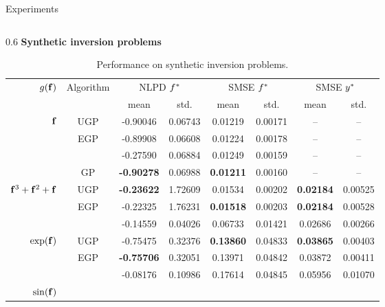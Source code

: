 \documentclass[final]{beamer}
\newlength{\twocolwid}
\begin{document}
\begin{frame}[t]
\begin{columns}[t]
\begin{column}{\twocolwid}
\begin{columns}[t,totalwidth=\twocolwid]
\begin{column}{\twocolwid}
\begin{block}{Experiments}
\begin{columns}
\begin{column}{0.6\twocolwid}
\textbf{Synthetic inversion problems}


\begin{table}[tb]
    \centering

    \caption[]{
        Performance on synthetic inversion problems.
        }
    \vspace{5mm}
    \small
    \begin{tabular}{r|c| c c c c c c}
        \multirow{2}{*}{$g\!\left({{\mathbf{f}}}\right)$} & \multirow{2}{*}{Algorithm} & 
            \multicolumn{2}{c}{NLPD $f^{*}$} &
            \multicolumn{2}{c}{SMSE $f^{*}$} &
            \multicolumn{2}{c}{SMSE $y^{*}$} \\
        & & mean & std. & mean & std. & mean & std.\\
        \toprule
        $\mathbf{f}$ 
& UGP & -0.90046 & 0.06743 & 0.01219 & 0.00171 & -- & -- \\
& EGP & -0.89908 & 0.06608 & 0.01224 & 0.00178 & -- & -- \\
& \cite{Opper2009} & -0.27590 & 0.06884 & 0.01249 & 0.00159 & -- & -- \\
& GP & \textbf{-0.90278} & 0.06988 & \textbf{0.01211} & 0.00160 & -- & -- \\
        \midrule
        $\mathbf{f}^3 + \mathbf{f}^2 + \mathbf{f}$ 
& UGP & \textbf{-0.23622} & 1.72609 & 0.01534 & 0.00202 & \textbf{0.02184} & 0.00525 \\
& EGP & -0.22325 & 1.76231 & \textbf{0.01518} & 0.00203 & \textbf{0.02184} & 0.00528 \\
& \cite{Opper2009} & -0.14559 & 0.04026 & 0.06733 & 0.01421 & 0.02686 & 0.00266 \\
        \midrule
        $\exp\!\left({\mathbf{f}}\right)$ 
& UGP & -0.75475 & 0.32376 & \textbf{0.13860} & 0.04833 & \textbf{0.03865} & 0.00403 \\
& EGP & \textbf{-0.75706} & 0.32051 & 0.13971 & 0.04842 & 0.03872 & 0.00411 \\
& \cite{Opper2009} & -0.08176 & 0.10986 & 0.17614 & 0.04845 & 0.05956 & 0.01070 \\
        \midrule
        $\sin\!\left({\mathbf{f}}\right)$ 

\end{tabular}
\end{table}
\end{column}
\end{columns}
\end{block}
\end{column}
\end{columns}
\end{column}
\end{columns}
\end{frame}
\end{document}
